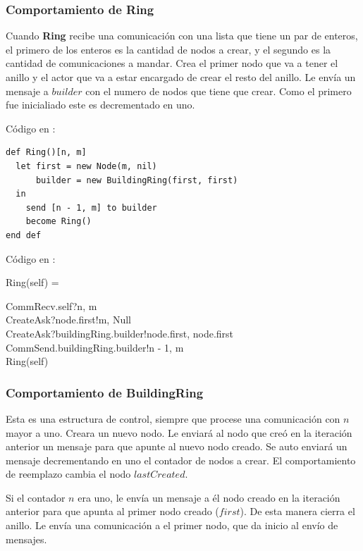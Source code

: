\subsubsection*{Comportamiento de Ring}

Cuando \textbf{Ring} recibe una comunicación con una lista que tiene un par de enteros, el primero de los enteros es la cantidad de nodos a crear, y el segundo es la cantidad de comunicaciones a mandar. Crea el primer nodo que va a tener el anillo y el actor que va a estar encargado de crear el resto del anillo. Le envía un mensaje a $builder$ con el numero de nodos que tiene que crear. Como el primero fue inicialiado este es decrementado en uno.

Código en \SAL:

\begin{lstlisting}[language=sal, style=simple]
def Ring()[n, m]
  let first = new Node(m, nil)
      builder = new BuildingRing(first, first) 
  in
    send [n - 1, m] to builder
    become Ring() 
end def
\end{lstlisting}

Código en \CSP:

\begin{process}
Ring(self) = \\ \quad
  \begin{block}
  CommRecv.self?\langle n, m \rangle \then \\
  CreateAsk?node.first!\langle m, Null \rangle \then \\
  CreateAsk?buildingRing.builder!\langle node.first, node.first \rangle \then \\
  CommSend.buildingRing.builder!\langle n - 1, m\rangle \then \\
  Ring(self)
  \end{block}
\end{process}

\subsubsection*{Comportamiento de BuildingRing}

Esta es una estructura de control, siempre que procese una comunicación con $n$ mayor a uno. Creara un nuevo nodo. Le enviará al nodo que creó en la iteración anterior un mensaje para que apunte al nuevo nodo creado. Se auto enviará un mensaje decrementando en uno el contador de nodos a crear. El comportamiento de reemplazo cambia el nodo $lastCreated$.

Si el contador $n$ era uno, le envía un mensaje a él nodo creado en la iteración anterior para que apunta al primer nodo creado ($first$). De esta manera cierra el anillo. Le envía una comunicación a el primer nodo, que da inicio al envío de mensajes. 

